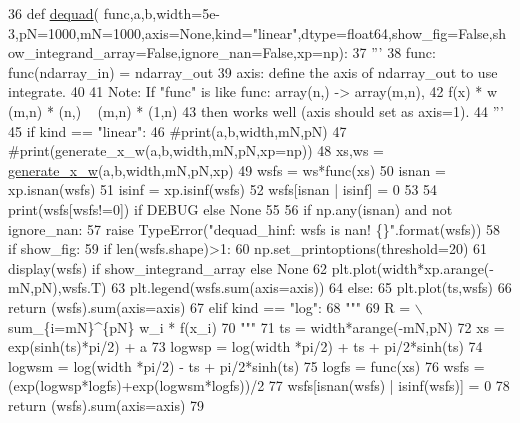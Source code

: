 \begin{DoxyCode}
36 \textcolor{keyword}{def }\hyperlink{namespacedequad_a312cb2f278bec2760a7cb9a17bf3928f}{dequad}(
      func,a,b,width=5e-3,pN=1000,mN=1000,axis=None,kind="linear",dtype=float64,show\_fig=False,show\_integrand\_array=False,ignore\_nan=False,xp=np):
37     \textcolor{stringliteral}{'''}
38 \textcolor{stringliteral}{    func: func(ndarray\_in) = ndarray\_out}
39 \textcolor{stringliteral}{    axis: define the axis of ndarray\_out to use integrate.}
40 \textcolor{stringliteral}{    }
41 \textcolor{stringliteral}{    Note: If "func" is like func: array(n,) -> array(m,n),}
42 \textcolor{stringliteral}{              f(x) * w ~ (m,n) * (n,) ~ (m,n) * (1,n)}
43 \textcolor{stringliteral}{          then works well (axis should set as axis=1). }
44 \textcolor{stringliteral}{    '''}
45     \textcolor{keywordflow}{if} kind == \textcolor{stringliteral}{"linear"}:
46         \textcolor{comment}{#print(a,b,width,mN,pN)}
47         \textcolor{comment}{#print(generate\_x\_w(a,b,width,mN,pN,xp=np))}
48         xs,ws = \hyperlink{namespacedequad_a0774348e796cb0945f2e0b0a7fa1c1e9}{generate\_x\_w}(a,b,width,mN,pN,xp)
49         wsfs = ws*func(xs)
50         isnan = xp.isnan(wsfs)
51         isinf = xp.isinf(wsfs)
52         wsfs[isnan | isinf] = 0
53         
54         print(wsfs[wsfs!=0]) \textcolor{keywordflow}{if} DEBUG \textcolor{keywordflow}{else} \textcolor{keywordtype}{None}
55         
56         \textcolor{keywordflow}{if} np.any(isnan) \textcolor{keywordflow}{and} \textcolor{keywordflow}{not} ignore\_nan:
57             \textcolor{keywordflow}{raise} TypeError(\textcolor{stringliteral}{"dequad\_hinf: wsfs is nan! \{\}"}.format(wsfs))
58         \textcolor{keywordflow}{if} show\_fig:
59             \textcolor{keywordflow}{if} len(wsfs.shape)>1:
60                 np.set\_printoptions(threshold=20)
61                 display(wsfs) \textcolor{keywordflow}{if} show\_integrand\_array \textcolor{keywordflow}{else} \textcolor{keywordtype}{None}
62                 plt.plot(width*xp.arange(-mN,pN),wsfs.T)
63                 plt.legend(wsfs.sum(axis=axis))
64             \textcolor{keywordflow}{else}:
65                 plt.plot(ts,wsfs)
66         \textcolor{keywordflow}{return} (wsfs).sum(axis=axis)
67     \textcolor{keywordflow}{elif} kind == \textcolor{stringliteral}{"log"}:
68         \textcolor{stringliteral}{"""}
69 \textcolor{stringliteral}{        R = \(\backslash\)sum\_\{i=mN\}^\{pN\} w\_i * f(x\_i)}
70 \textcolor{stringliteral}{        """}
71         ts = width*arange(-mN,pN)
72         xs = exp(sinh(ts)*pi/2) + a
73         logwsp = log(width *pi/2) + ts + pi/2*sinh(ts)
74         logwsm = log(width *pi/2) - ts + pi/2*sinh(ts)
75         logfs = func(xs)
76         wsfs = (exp(logwsp*logfs)+exp(logwsm*logfs))/2
77         wsfs[isnan(wsfs) | isinf(wsfs)] = 0
78         \textcolor{keywordflow}{return} (wsfs).sum(axis=axis)
79 
\end{DoxyCode}
